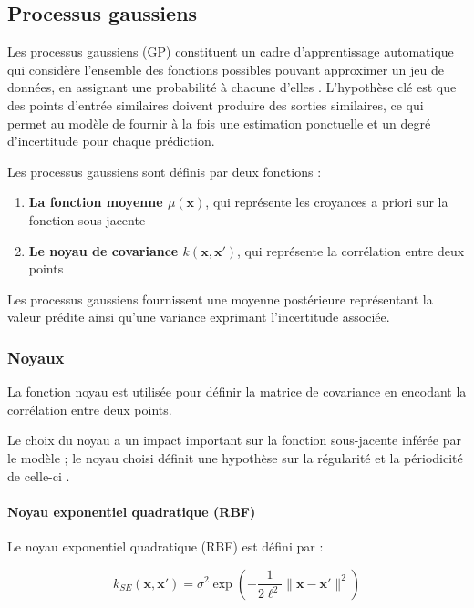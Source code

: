 \subsection{Processus gaussiens}

Les processus gaussiens (GP) constituent un cadre d'apprentissage automatique qui considère l'ensemble des fonctions possibles pouvant approximer un jeu de données, en assignant une probabilité à chacune d'elles \cite{rasmussen2006gaussian}. L'hypothèse clé est que des points d'entrée similaires doivent produire des sorties similaires, ce qui permet au modèle de fournir à la fois une estimation ponctuelle et un degré d'incertitude pour chaque prédiction.

Les processus gaussiens sont définis par deux fonctions :

\begin{enumerate}[noitemsep]
    \item \textbf{La fonction moyenne $\mu(\mathbf{x})$}, qui représente les croyances a priori sur la fonction sous-jacente
    \item \textbf{Le noyau de covariance $k(\mathbf{x}, \mathbf{x}')$}, qui représente la corrélation entre deux points
\end{enumerate}

Les processus gaussiens fournissent une moyenne postérieure représentant la valeur prédite ainsi qu'une variance exprimant l'incertitude associée.

\subsubsection{Noyaux}
\label{sec:noyaux}
La fonction noyau est utilisée pour définir la matrice de covariance en encodant la corrélation entre deux points.

Le choix du noyau a un impact important sur la fonction sous-jacente inférée par le modèle ; le noyau choisi définit une hypothèse sur la régularité et la périodicité de celle-ci \cite{martens2016gpis}.

\paragraph{Noyau exponentiel quadratique (RBF)}

Le noyau exponentiel quadratique (RBF) est défini par :

\begin{equation}
k_{SE}(\mathbf{x}, \mathbf{x}') = \sigma^2 \exp \left(- \frac{1}{2\ell^2} \|\mathbf{x} - \mathbf{x}'\|^2 \right)
\end{equation} 
\cite{martens2016gpis}

